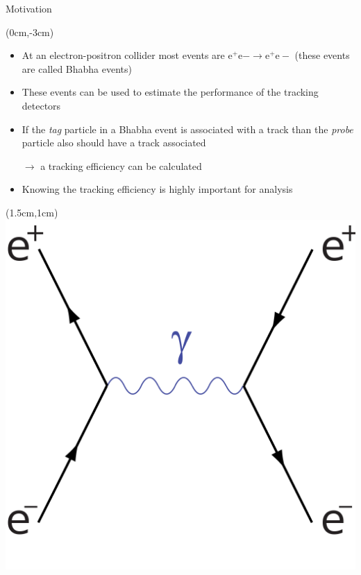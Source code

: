 \documentclass[8pt]{beamer}
\begin{document}
\begin{frame}{Motivation}
	\begin{textblock*}{11cm}(0cm,-3cm)
		
	\begin{itemize}
		\item At an electron-positron collider most events are $\textrm{e}^+ \textrm{e}- \rightarrow\textrm{e}^+ \textrm{e}- $ (these events are called Bhabha events)
		\item These events can be used to estimate the performance of the tracking detectors
		\item If the \textit{tag} particle in a Bhabha event is associated with a track than the \textit{probe} particle also should have a track associated 
		
		$\rightarrow$ a tracking efficiency can be calculated
		\item Knowing the tracking efficiency is highly important for analysis 
	\end{itemize}
\end{textblock*}




\begin{textblock*}{3cm}(1.5cm,1cm)
	\includegraphics[width=\textwidth]{VBilder/bhabhaS}
\end{textblock*}


\end{frame}
\end{document}
